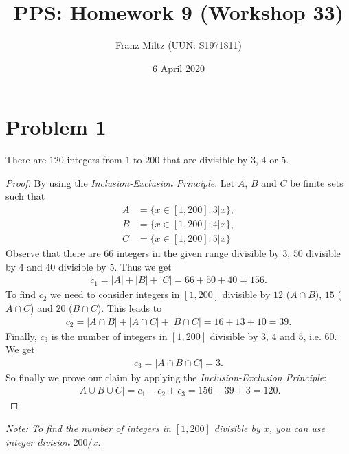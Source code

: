 \documentclass{article}
\title{PPS: Homework 9 (Workshop 33)}
\author{Franz Miltz (UUN: S1971811)}
\date{6 April 2020}
\begin{document}
\maketitle

\section*{Problem 1}
\begin{claim}
  There are $120$ integers from $1$ to $200$ that are divisible by $3$, $4$ or $5$.
\end{claim}
\begin{proof}
  By using the \emph{Inclusion-Exclusion Principle}.
  Let $A$, $B$ and $C$ be finite sets such that
  \begin{align*}
    A & = \{x\in [1,200] : 3 | x\}, \\
    B & = \{x \in [1,200] : 4|x\},  \\
    C & = \{x\in [1,200] : 5|x\}
  \end{align*}
  Observe that there are $66$ integers in the given range divisible by $3$, $50$ divisible by $4$ and $40$ divisible by $5$.
  Thus we get
  \begin{align*}
    c_1 = |A| + |B| + |C| = 66 + 50 + 40 = 156.
  \end{align*}
  To find $c_2$ we need to consider integers in $[1,200]$ divisible by $12$ ($A\cap B$), $15$ ($A\cap C$) and $20$ ($B\cap C$). This leads to
  \begin{align*}
    c_2 = |A\cap B| + |A\cap C| + |B \cap C| = 16 + 13 + 10 = 39.
  \end{align*}
  Finally, $c_3$ is the number of integers in $[1,200]$ divisible by $3$, $4$ and $5$, i.e. $60$. We get
  \begin{align*}
    c_3 = |A\cap B \cap C| = 3.
  \end{align*}
  So finally we prove our claim by applying the \emph{Inclusion-Exclusion Principle}:
  \begin{align*}
    |A\cup B \cup C| = c_1- c_2 + c_3 = 156 - 39 + 3 = 120.
  \end{align*}
\end{proof}
\noindent\emph{Note: To find the number of integers in $[1,200]$ divisible by $x$, you can use integer division $200 / x$}.
\end{document}
